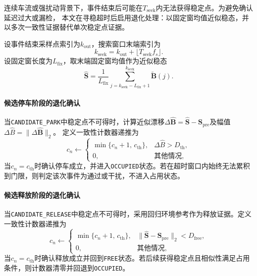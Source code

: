 \documentclass{xdupgthesis}
\begin{document}
连续车流或强扰动背景下，事件结束后可能在$T_{\mathrm{seek}}$内无法获得稳定点。为避免确认延迟过大或漏检，
本文在寻稳超时后启用退化处理：以固定窗均值近似稳态，并以多次一致性证据替代单次稳定点证据。

设事件结束采样点索引为$k_{\mathrm{out}}$，搜索窗口末端索引为
\begin{equation}
k_{\mathrm{seek}} = k_{\mathrm{out}} + \lfloor T_{\mathrm{seek}} f_s \rfloor.
\label{eq:ch4_kseek}
\end{equation}
设固定窗长度为$L_{\mathrm{fix}}$，取末端固定窗均值作为近似稳态
\begin{equation}
\hat{\mathbf{S}} = \frac{1}{L_{\mathrm{fix}}}\sum_{j = k_{\mathrm{seek}} - L_{\mathrm{fix}} + 1}^{k_{\mathrm{seek}}}\widetilde{\mathbf{B}}(j).
\label{eq:ch4_Shat}
\end{equation}

\paragraph{候选停车阶段的退化确认}
当\texttt{CANDIDATE\_PARK}中稳定点不可得时，计算近似漂移$\Delta\hat{\mathbf{B}}=\hat{\mathbf{S}}-\mathbf{S}_{\mathrm{pre}}$及幅值$\Delta\hat{B}=\lVert\Delta\hat{\mathbf{B}}\rVert_2$。
定义一致性计数器递推为
\begin{equation}
c_n \leftarrow
\begin{cases}
\min\{c_n+1,\,c_{\mathrm{th}}\}, & \Delta\hat{B} > D_{\mathrm{th}},\\
0, & \text{其他情况},
\end{cases}
\label{eq:ch4_cnt_park}
\end{equation}
当$c_n=c_{\mathrm{th}}$时确认停车成立，并进入\texttt{OCCUPIED}状态。若在超时窗口内始终无法累积到门限，则判定该次事件为通过或干扰，不进入占用状态。

\paragraph{候选释放阶段的退化确认}
当\texttt{CANDIDATE\_RELEASE}中稳定点不可得时，采用回归环境参考作为释放证据。定义一致性计数器递推为
\begin{equation}
c_n \leftarrow
\begin{cases}
\min\{c_n+1,\,c_{\mathrm{th}}\}, & \lVert\hat{\mathbf{S}}-\mathbf{S}_{\mathrm{pre}}\rVert_2 < D_{\mathrm{free}},\\
0, & \text{其他情况},
\end{cases}
\label{eq:ch4_cnt_free}
\end{equation}
当$c_n=c_{\mathrm{th}}$时确认释放成立并回到\texttt{FREE}状态。若后续获得稳定点且相似性满足占用条件，则计数器清零并回退到\texttt{OCCUPIED}。
\end{document}

